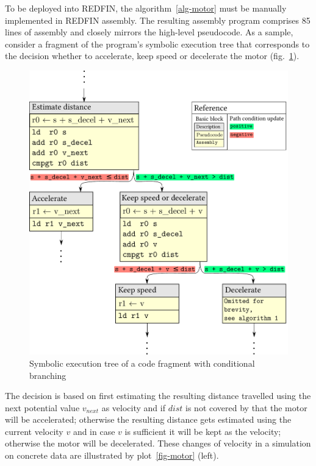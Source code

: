 To be deployed into REDFIN, the algorithm~\ref{alg-motor} must be manually
implemented in REDFIN assembly. The resulting assembly program comprises 85 lines of
assembly and closely mirrors the high-level pseudocode. As a sample, consider a fragment of
the program's symbolic execution tree that corresponds to the decision whether to
accelerate, keep speed or decelerate the motor (fig.~\ref{fig-sym-tree}).

\begin{figure}[h]
\centerline{\includegraphics[scale=0.4]{fig/sym-tree.pdf}}
\caption{Symbolic execution tree of a code fragment with conditional branching\label{fig-sym-tree}}
\end{figure}

The decision is based on first estimating the resulting distance travelled using
the next potential value $v_{next}$ as velocity and if $dist$ is not covered by that
the motor will be accelerated; otherwise the resulting distance gets estimated
using the current velocity $v$ and in case $v$ is sufficient it will be kept as the
velocity; otherwise the motor will be decelerated. These changes of velocity in
a simulation on concrete data are illustrated by plot~\ref{fig-motor} (left).

